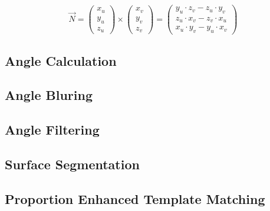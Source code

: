 $$ \vec{N} = \left( \begin{array}{c} x_u \\ y_u \\ z_u \end{array} \right) \times \left( \begin{array}{c} x_v \\ y_v \\ z_v \end{array} \right) 
= \left( \begin{array}{c} y_u \cdot z_v - z_u \cdot y_v \\ z_u \cdot x_v - z_v \cdot x_u \\ x_u \cdot y_v - y_u \cdot x_v \end{array}\right)
$$


\subsection{Angle Calculation}

\subsection{Angle Bluring}

\subsection{Angle Filtering}

\subsection{Surface Segmentation}

\subsection{Proportion Enhanced Template Matching}


% 
% 
% 
% 
% 
% 
% 










